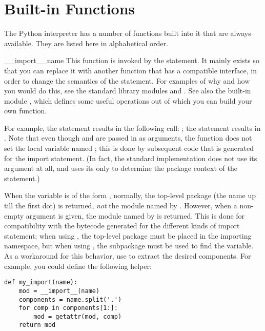 \section{Built-in Functions \label{built-in-funcs}}

The Python interpreter has a number of functions built into it that
are always available.  They are listed here in alphabetical order.



\begin{funcdesc}{__import__}{name}
  This function is invoked by the 
  statement.  It mainly exists so that you can replace it with another
  function that has a compatible interface, in order to change the
  semantics of the  statement.  For examples of why
  and how you would do this, see the standard library modules
   and
  .  See also the built-in
  module , which defines some useful
  operations out of which you can build your own
   function.

  For example, the statement  results in the
  following call:  
  ; the statement 
  results in .  Note that even though  and
  \code{['eggs']} are passed in as arguments, the
   function does not set the local variable
  named ; this is done by subsequent code that is generated
  for the import statement.  (In fact, the standard implementation
  does not use its  argument at all, and uses its
   only to determine the package context of the
   statement.)

  When the  variable is of the form ,
  normally, the top-level package (the name up till the first dot) is
  returned, \emph{not} the module named by .  However, when
  a non-empty  argument is given, the module named by
   is returned.  This is done for compatibility with the
  bytecode generated for the different kinds of import statement; when
  using , the top-level package 
  must be placed in the importing namespace, but when using , the  subpackage must be used
  to find the  variable.  As a workaround for this
  behavior, use  to extract the desired
  components.  For example, you could define the following helper:

\begin{verbatim}
def my_import(name):
    mod = __import__(name)
    components = name.split('.')
    for comp in components[1:]:
        mod = getattr(mod, comp)
    return mod
\end{verbatim}
\end{funcdesc}

